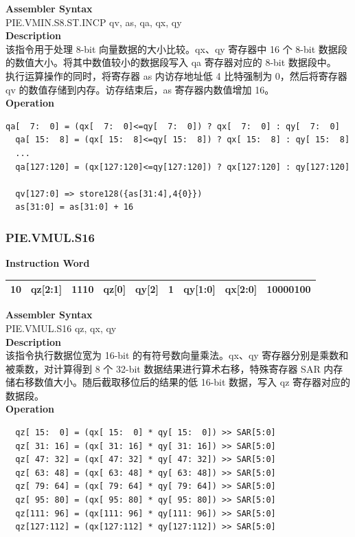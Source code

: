 \textbf{Assembler Syntax} \\
PIE.VMIN.S8.ST.INCP qv, as, qa, qx, qy \\
\textbf{Description} \\
该指令用于处理 8-bit 向量数据的大小比较。qx、qy 寄存器中 16 个 8-bit 数据段的数值大小。将其中数值较小的数据段写入 qa 寄存器对应的 8-bit 数据段中。\\
执行运算操作的同时，将寄存器 as 内访存地址低 4 比特强制为 0，然后将寄存器 qv 的数值存储到内存。访存结束后，as 寄存器内数值增加 16。\\
\textbf{Operation}
\begin{lstlisting}[escapeinside=`?]
  qa[  7:  0] = (qx[  7:  0]<=qy[  7:  0]) ? qx[  7:  0] : qy[  7:  0]
  qa[ 15:  8] = (qx[ 15:  8]<=qy[ 15:  8]) ? qx[ 15:  8] : qy[ 15:  8]
  ...
  qa[127:120] = (qx[127:120]<=qy[127:120]) ? qx[127:120] : qy[127:120]

  qv[127:0] => store128({as[31:4],4{0}})
  as[31:0] = as[31:0] + 16
\end{lstlisting}

\newpage
\subsubsection{PIE.VMUL.S16}\label{instruction:PIEVMULS16}
\setlength\tabcolsep{6pt}
\textbf{Instruction Word} \\
\begin{tabular}{|c|c|c|c|c|c|c|c|c|}
	\hline
	10 & qz[2:1] & 1110 & qz[0] & qy[2] & 1 & qy[1:0] & qx[2:0] & 10000100 \\
	\hline
\end{tabular}

\textbf{Assembler Syntax} \\
PIE.VMUL.S16 qz, qx, qy \\
\textbf{Description} \\
该指令执行数据位宽为 16-bit 的有符号数向量乘法。qx、qy 寄存器分别是乘数和被乘数，对计算得到 8 个 32-bit 数据结果进行算术右移，特殊寄存器 SAR 内存储右移数值大小。随后截取移位后的结果的低 16-bit 数据，写入 qz 寄存器对应的数据段。\\
\textbf{Operation}
\begin{lstlisting}
  qz[ 15:  0] = (qx[ 15:  0] * qy[ 15:  0]) >> SAR[5:0]
  qz[ 31: 16] = (qx[ 31: 16] * qy[ 31: 16]) >> SAR[5:0]
  qz[ 47: 32] = (qx[ 47: 32] * qy[ 47: 32]) >> SAR[5:0]
  qz[ 63: 48] = (qx[ 63: 48] * qy[ 63: 48]) >> SAR[5:0]
  qz[ 79: 64] = (qx[ 79: 64] * qy[ 79: 64]) >> SAR[5:0]
  qz[ 95: 80] = (qx[ 95: 80] * qy[ 95: 80]) >> SAR[5:0]
  qz[111: 96] = (qx[111: 96] * qy[111: 96]) >> SAR[5:0]
  qz[127:112] = (qx[127:112] * qy[127:112]) >> SAR[5:0]
\end{lstlisting}

